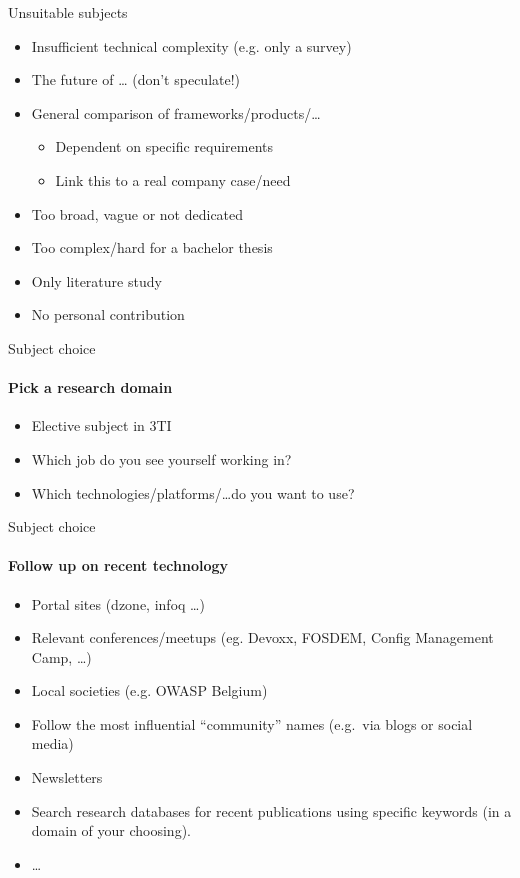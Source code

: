 \documentclass[aspectratio=169]{beamer}
\begin{document}
    \begin{frame}{Unsuitable subjects}
        
        \begin{itemize}
            \item Insufficient technical complexity (e.g. only a survey)
            \item The future of \ldots{} (don't speculate!)
            \item General comparison of frameworks/products/\ldots
            \begin{itemize}
                \item Dependent on specific requirements
                \item Link this to a real company case/need
            \end{itemize}
            \item Too broad, vague or not dedicated
            \item Too complex/hard for a bachelor thesis
            \item Only literature study
            \item No personal contribution
        \end{itemize}
        
    \end{frame}
    
    \begin{frame}{Subject choice}
        \framesubtitle{Pick a research domain}
        
        \begin{itemize}
            \item Elective subject in 3TI
            \item Which job do you see yourself working in?
            \item Which technologies/platforms/\ldots  do you want to use?
        \end{itemize}
        
    \end{frame}
    
    \begin{frame}{Subject choice}
        \framesubtitle{Follow up on recent technology}
        
        \begin{itemize}
            \item Portal sites (dzone, infoq \ldots)
            \item Relevant conferences/meetups (eg. Devoxx, FOSDEM, Config Management Camp, \ldots)
            \item Local societies (e.g. OWASP Belgium)
            \item Follow the most influential ``community'' names (e.g.\ via blogs or social media)            
            \item Newsletters
            \item Search research databases for recent publications using specific keywords (in a domain of your choosing).
            \item \ldots
        \end{itemize}
        
    \end{frame}
    
\end{document}
